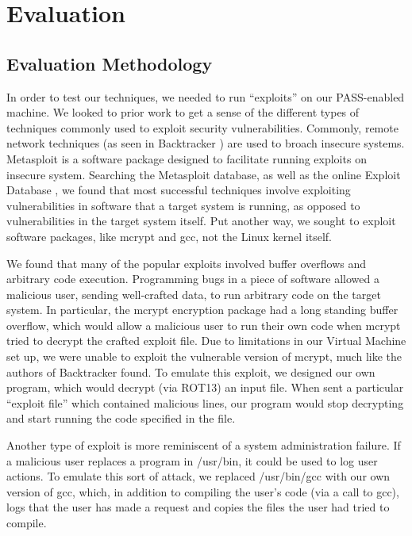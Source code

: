 \documentclass[10pt,twocolumn]{article}
\begin{document}
%

\section{Evaluation}

\subsection{Evaluation Methodology}
In order to test our techniques, we needed to run “exploits” on our PASS-enabled machine. We looked to prior work to get a sense of the different types of techniques commonly used to exploit security vulnerabilities. Commonly, remote network techniques (as seen in Backtracker \cite{backtracker}) are used to broach insecure systems. Metasploit \cite{metasploit} is a software package designed to facilitate running exploits on insecure system. Searching the Metasploit database, as well as the online Exploit Database \cite{exploitdb}, we found that most successful techniques involve exploiting vulnerabilities in software that a target system is running, as opposed to vulnerabilities in the target system itself. Put another way, we sought to exploit software packages, like mcrypt and gcc, not the Linux kernel itself. 

We found that many of the popular exploits involved buffer overflows and arbitrary code execution. Programming bugs in a piece of software allowed a malicious user, sending well-crafted data, to run arbitrary code on the target system. In particular, the mcrypt encryption package had a long standing buffer overflow, which would allow a malicious user to run their own code when mcrypt tried to decrypt the crafted exploit file. Due to limitations in our Virtual Machine set up, we were unable to exploit the vulnerable version of mcrypt, much like the authors of Backtracker \cite{backtracker} found. To emulate this exploit, we designed our own program, which would decrypt (via ROT13) an input file. When sent a particular “exploit file” which contained malicious lines, our program would stop decrypting and start running the code specified in the file.

Another type of exploit is more reminiscent of a system administration failure. If a malicious user replaces a program in /usr/bin, it could be used to log user actions. To emulate this sort of attack, we replaced /usr/bin/gcc with our own version of gcc, which, in addition to compiling the user’s code (via a call to gcc), logs that the user has made a request and copies the files the user had tried to compile. 
\end{document}
